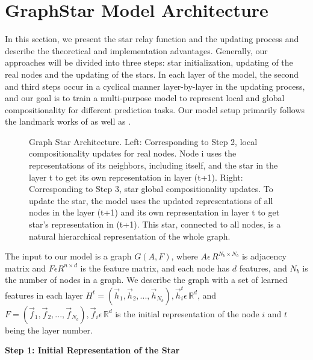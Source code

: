 \documentclass{article}
\begin{document}
\section{GraphStar Model Architecture}

In this section, we present the star relay function and the updating process and describe the theoretical and implementation advantages. Generally, our approaches will be divided into three steps: star initialization, updating of the real nodes and the updating of the stars. In each layer of the model, the second and third steps occur in a cyclical manner layer-by-layer in the updating process, and our goal is to train a multi-purpose model to represent local and global compositionality for different prediction tasks. Our model setup primarily follows the landmark works of \cite{velivckovic2017graph,wang2018non} as well as \cite{guo2019star}. 



\begin{figure}[htb]
      \caption{\label{fig:Graph Star Architecture} Graph Star Architecture. Left: Corresponding to Step 2, local compositionality updates for real nodes. Node i uses the representations of its neighbors, including itself, and the star in the layer t to get its own representation in layer (t+1). Right: Corresponding to Step 3, star global compositionality updates. To update the star, the model uses the updated representations of all nodes in the layer (t+1) and its own representation in layer t to get star’s representation in (t+1). This star, connected to all nodes, is a natural hierarchical representation of the whole graph.}
\end{figure}

The input to our model is a graph \(G(A,F)\), where  \(A \epsilon\,R^{N_b \times N_b}\) is adjacency matrix and \(F\epsilon R^{n \times d}\) is the feature matrix, and each node has \(d\) features, and \(N_b\) is the number of nodes in a graph. We describe the graph with a set of learned features in each layer \(H^{t} = (\overrightarrow{h}_1,\overrightarrow{h}_2,...,\overrightarrow{h}_{N_b}),\overrightarrow{h}_i^t\epsilon\,\mathbb{R}^d \), and \(F = (\overrightarrow{f}_1,\overrightarrow{f}_2,...,\overrightarrow{f}_{N_b}),\overrightarrow{f}_i\epsilon\,\mathbb{R}^d \) is the initial representation of the node \(i\) and \(t\) being the layer number. 

\textbf{Step 1: Initial Representation of the Star}
\end{document}

